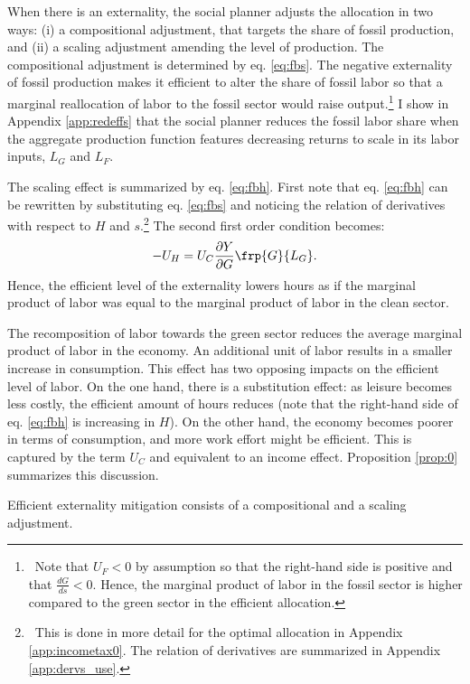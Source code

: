 When there is an externality, the social planner adjusts the allocation in two ways: (i) a compositional adjustment, that targets the share of fossil production, and (ii) a scaling adjustment amending the level of production. 
The compositional adjustment is determined by eq. \eqref{eq:fbs}.
The negative externality of fossil production makes it efficient to alter the share of fossil labor so that  a marginal reallocation of labor to the fossil sector would raise output.\footnote{\ Note that $U_F<0$ by assumption so that the right-hand side is positive and that $\frac{dG}{ds}<0$. Hence, the marginal product of labor in the fossil sector is higher compared to the green sector in the efficient allocation.} %
I show in Appendix \ref{app:redeffs} that the social planner reduces the fossil labor share when the aggregate production function features decreasing returns to scale in its labor inputs, $L_G$ and $L_F$.


The scaling effect is summarized by eq. \eqref{eq:fbh}.
First note that eq. \eqref{eq:fbh} can be rewritten by substituting eq. \eqref{eq:fbs} and noticing the relation of derivatives with respect to $H$ and $s$.\footnote{\ This is done in more detail for the optimal allocation in Appendix \ref{app:incometax0}. The relation of derivatives are summarized in Appendix \ref{app:dervs_use}.}  
The second first order condition becomes:
\begin{align}\label{eq:fbh_simp}
-U_H=U_C\frac{\partial Y}{\partial G}\frp{G}{L_G}.
\end{align}
Hence, the efficient level of the externality lowers hours as if the marginal product of labor was equal to the marginal product of labor in the clean sector.

The recomposition of labor towards the  green sector reduces the average marginal product of labor in the economy. An additional unit of labor results in a smaller increase in consumption.  This effect has two opposing impacts on the efficient level of labor. On the one hand, there is a substitution effect: as leisure becomes less costly, the efficient amount of hours reduces (note that the right-hand side of eq. \eqref{eq:fbh} is increasing in $H$). On the other hand, the economy becomes poorer in terms of consumption, and more work effort might be efficient. This is captured by the term $U_C$ and equivalent to an income effect. 
Proposition \ref{prop:0} summarizes this discussion.
\begin{prop}\label{prop:0}
	Efficient externality mitigation consists of a compositional and a scaling adjustment. 
\end{prop}


